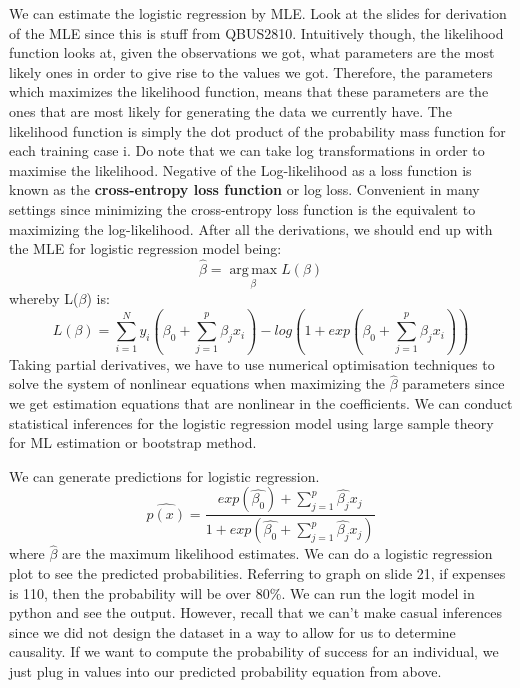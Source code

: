 \documentclass[11pt, oneside]{article}
\theoremstyle{definition}
\DeclareMathOperator*{\argmax}{arg\,max}
\begin{document}
We can estimate the logistic regression by MLE. Look at the slides for derivation of the MLE since this is stuff from QBUS2810. Intuitively though, the likelihood function looks at, given the observations we got, what parameters are the most likely ones in order to give rise to the values we got. Therefore, the parameters which maximizes the likelihood function, means that these parameters are the ones that are most likely for generating the data we currently have. The likelihood function is simply the dot product of the probability mass function for each training case i. Do note that we can take log transformations in order to maximise the likelihood. Negative of the Log-likelihood as a loss function is known as the \textbf{cross-entropy loss function} or log loss. Convenient in many settings since minimizing the cross-entropy loss function is the equivalent to maximizing the log-likelihood. After all the derivations, we should end up with the MLE for logistic regression model being:
$$
\hat{\beta} = \argmax\limits_{\beta}L(\beta)
$$
whereby L($\beta$) is:
$$
L(\beta) = \sum_{i=1}^{N}y_i(\beta_0 + \sum_{j=1}^{p}\beta_jx_i) - log(1 + exp(\beta_0 + \sum_{j=1}^{p}\beta_jx_i))
$$
Taking partial derivatives, we have to use numerical optimisation techniques to solve the system of nonlinear equations when maximizing the $\hat{\beta}$ parameters since we get estimation equations that are nonlinear in the coefficients. We can conduct statistical inferences for the logistic regression model using large sample theory for ML estimation or bootstrap method.

We can generate predictions for logistic regression.
$$
\hat{p(x)} = \frac{exp(\hat{\beta_0}) + \sum_{j=1}^{p}\hat{\beta_j}x_j}{1 + exp(\hat{\beta_0} + \sum_{j=1}^{p}\hat{\beta_j}x_j)}
$$
where $\hat{\beta}$ are the maximum likelihood estimates. We can do a logistic regression plot to see the predicted probabilities. Referring to graph on slide 21, if expenses is 110, then the probability will be over 80\%. We can run the logit model in python and see the output. However, recall that we can't make casual inferences since we did not design the dataset in a way to allow for us to determine causality. If we want to compute the probability of success for an individual, we just plug in values into our predicted probability equation from above.
\end{document}

